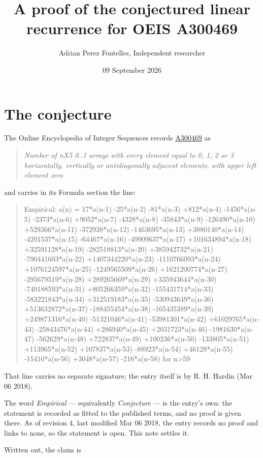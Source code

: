 \documentclass[11pt]{article}
\title{A proof of the conjectured linear recurrence for OEIS A300469}
\author{Adrian Perez Fontelles, Independent researcher}
\date{09 September 2026}
\theoremstyle{definition}
\begin{document}
\maketitle
\section{The conjecture}

The Online Encyclopedia of Integer Sequences records \href{https://oeis.org/A300469}{A300469} as

\begin{quote}\itshape Number of nX5 0..1 arrays with every element equal to 0, 1, 2 or 3 horizontally, vertically or antidiagonally adjacent elements, with upper left element zero\end{quote}

and carries in its Formula section the line:

\begin{quote}\ttfamily Empirical: a(n) = 17*a(n-1) -25*a(n-2) -81*a(n-3) +812*a(n-4) -1456*a(n-5) -2373*a(n-6) +9052*a(n-7) -4328*a(n-8) -35843*a(n-9) -126490*a(n-10) +529366*a(n-11) -372938*a(n-12) -1463695*a(n-13) +3880140*a(n-14) -4201537*a(n-15) -64467*a(n-16) -49909637*a(n-17) +101634894*a(n-18) +32591128*a(n-19) -282518813*a(n-20) +385942732*a(n-21) -790441603*a(n-22) +1407344220*a(n-23) -1110766093*a(n-24) +1076124597*a(n-25) -1249565509*a(n-26) +1621200774*a(n-27) -295679519*a(n-28) +289265669*a(n-29) +335943644*a(n-30) -740188593*a(n-31) +805266359*a(n-32) -155431714*a(n-33) -583221843*a(n-34) +312519183*a(n-35) -530943649*a(n-36) +513632872*a(n-37) -188455454*a(n-38) -165435389*a(n-39) +249871316*a(n-40) -51321046*a(n-41) -53981301*a(n-42) +61029765*a(n-43) -25843476*a(n-44) +286940*a(n-45) +2031723*a(n-46) -1981630*a(n-47) -562629*a(n-48) +722837*a(n-49) +100236*a(n-50) -133805*a(n-51) +113965*a(n-52) +107837*a(n-53) -88923*a(n-54) +46128*a(n-55) -15410*a(n-56) +3048*a(n-57) -216*a(n-58) for n>59\end{quote}

That line carries no separate signature; the entry itself is by R. H. Hardin (Mar 06 2018).

The word {\itshape Empirical} --- equivalently {\itshape Conjecture} --- is the entry's own: the statement is recorded as fitted to the published terms, and no proof is given there. As of revision 4, last modified Mar 06 2018, the entry records no proof and links to none, so the statement is open. This note settles it.

Written out, the claim is
\end{document}
